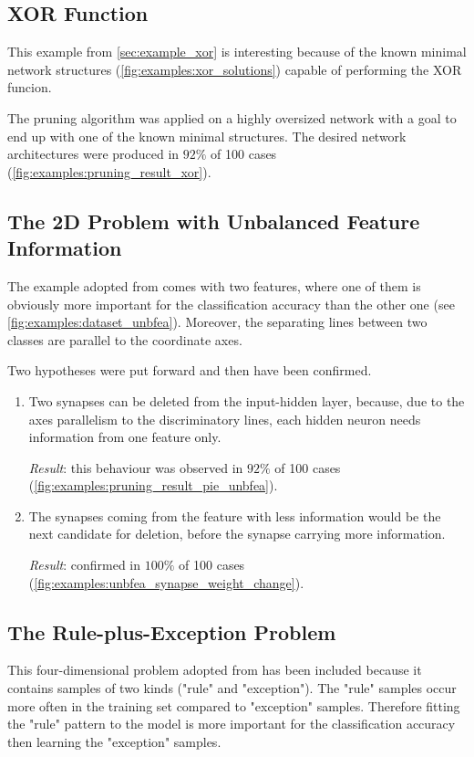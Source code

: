 \subsection*{XOR Function}
This example from \cref{sec:example_xor} is interesting because of the known minimal network structures (\cref{fig:examples:xor_solutions}) capable of performing the XOR funcion. 

The pruning algorithm was applied on a highly oversized network with a goal to end up with one of the known minimal structures. The desired network architectures were produced in $ 92\% $ of 100 cases (\cref{fig:examples:pruning_result_xor}).

\subsection*{The 2D Problem with Unbalanced Feature Information}
The example adopted from \citep{karnin:pa} comes with two features, where one of them is obviously more important for the classification accuracy than the other one (see \cref{fig:examples:dataset_unbfea}). Moreover, the separating lines between two classes are parallel to the coordinate axes.

Two hypotheses were put forward and then have been confirmed.

\begin{enumerate}
\item Two synapses can be deleted from the input-hidden layer, because, due to the axes parallelism to the discriminatory lines, each hidden neuron needs information from one feature only. 

\textit{Result}: this behaviour was observed in $ 92\% $ of 100 cases (\cref{fig:examples:pruning_result_pie_unbfea}).

\item  The synapses coming from the feature with less information would be the next candidate for deletion, before the synapse carrying more information.

\textit{Result}: confirmed in $ 100\% $ of 100 cases (\cref{fig:examples:unbfea_synapse_weight_change}).
\end{enumerate}

\subsection*{The Rule-plus-Exception Problem}
This four-dimensional problem adopted from \citep{mozer:skeletonization} has been included because it contains samples of two kinds ("rule" and "exception"). The "rule" samples occur more often in the training set compared to "exception" samples. Therefore fitting the "rule" pattern to the model is more important for the classification accuracy then learning the "exception" samples.

